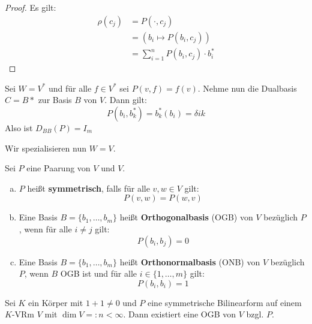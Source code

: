 \documentclass[parskip,a4paper,twoside,DIV15,BCOR12mm]{scrbook}
\begin{document}
\begin{proof}
Es gilt:
\begin{align*}
\rho(c_j)&=P(\cdot,c_j)\\
&=(b_i\mapsto P(b_i,c_j))\\
&=\sum_{i=1}^n P(b_i,c_j)\cdot b_i^*
\end{align*}
\end{proof}

\begin{example}
Sei $W=V^*$ und für alle $f\in V^*$ sei $P(v,f)=f(v)$. Nehme nun die Dualbasis 
$C=B*$ zur Basis $B$ von $V$. Dann gilt:
\[P(b_i,b_k^*)=b_k^*(b_i)=\delta{ik}\]
Also ist $D_{BB}(P)=I_m$
\end{example}

Wir spezialisieren nun $W=V$.

\begin{definition}
Sei $P$ eine Paarung von $V$ und $V$.
\begin{enumerate}[(a)]
\item $P$ heißt \textbf{symmetrisch}, falls für alle $v,w\in V$ gilt:
\[P(v,w)=P(w,v)\]
\item Eine Basis $B=\{b_1,\ldots,b_m\}$ heißt \textbf{Orthogonalbasis} (OGB) von $V$
bezüglich $P$, wenn für alle $i\ne j$ gilt:
\[P(b_i,b_j)=0\]
\item Eine Basis $B=\{b_1,\ldots,b_m\}$ heißt \textbf{Orthonormalbasis} (ONB) von $V$
bezüglich $P$, wenn $B$ OGB ist und für alle $i\in\{1,\ldots,m\}$ gilt:
\[P(b_i,b_i)=1\]
\end{enumerate}
\end{definition}

\begin{comment}
Falls eine OGB $B$ existiert, so ist die Fundamentalmatrix $D_{BB}(P)$ diagonal, insbesondere
symmetrisch, also ist $P$ symmetrisch.
\end{comment}

\begin{theo}
Sei $K$ ein Körper mit $1+1\ne 0$ und $P$ eine symmetrische Bilinearform auf einem
$K$-VRm $V$ mit $\dim V=:n<\infty$. Dann existiert eine OGB von $V$ bzgl. $P$.
\end{theo}
\end{document}
